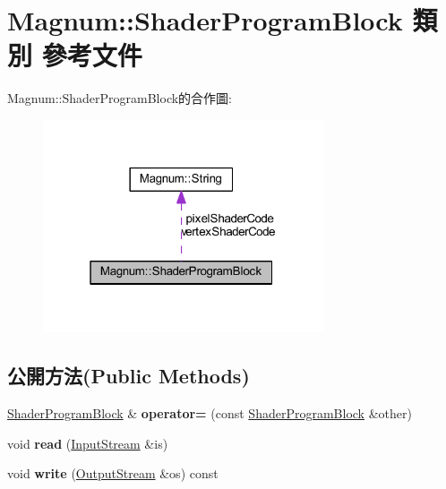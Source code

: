 \hypertarget{class_magnum_1_1_shader_program_block}{}\section{Magnum\+:\+:Shader\+Program\+Block 類別 參考文件}
\label{class_magnum_1_1_shader_program_block}


Magnum\+:\+:Shader\+Program\+Block的合作圖\+:\nopagebreak
\begin{figure}[H]
\begin{center}
\leavevmode
\includegraphics[width=235pt]{class_magnum_1_1_shader_program_block__coll__graph}
\end{center}
\end{figure}
\subsection*{公開方法(Public Methods)}
\begin{DoxyCompactItemize}
\item 
\hyperlink{class_magnum_1_1_shader_program_block}{Shader\+Program\+Block} \& {\bfseries operator=} (const \hyperlink{class_magnum_1_1_shader_program_block}{Shader\+Program\+Block} \&other)\hypertarget{class_magnum_1_1_shader_program_block_ac40958a4de45a615368a2a6d85576cd4}{}\label{class_magnum_1_1_shader_program_block_ac40958a4de45a615368a2a6d85576cd4}

\item 
void {\bfseries read} (\hyperlink{class_magnum_1_1_input_stream}{Input\+Stream} \&is)\hypertarget{class_magnum_1_1_shader_program_block_a51881b22a70ce5d4557433505ab433ca}{}\label{class_magnum_1_1_shader_program_block_a51881b22a70ce5d4557433505ab433ca}

\item 
void {\bfseries write} (\hyperlink{class_magnum_1_1_output_stream}{Output\+Stream} \&os) const \hypertarget{class_magnum_1_1_shader_program_block_afec3cdd0afefde397554bfb909bafc51}{}\label{class_magnum_1_1_shader_program_block_afec3cdd0afefde397554bfb909bafc51}

\end{DoxyCompactItemize}
